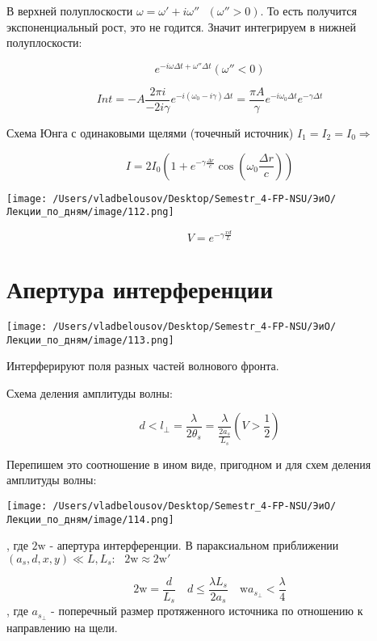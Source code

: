 \documentclass[12pt, a4paper]{report}
\begin{document}
В верхней полуплоскости \( \omega = \omega '+ i \omega '' \text{ }  (\omega '' > 0 ) \). То есть получится экспоненциальный рост, это не годится. Значит интегрируем в нижней полуплоскости: 

\[ e^{- i \omega \Delta t + \omega '' \Delta t } ( \omega'' < 0)  \] 

\[ Int = - A \frac{ 2 \pi i }{- 2 i \gamma } e^{ - i (\omega_0 - i \gamma ) \Delta t } = \frac{\pi A }{\gamma } e^{ - i \omega_0 \Delta t } e^{ - \gamma \Delta t }      \] 

Схема Юнга с одинаковыми щелями  (точечный источник) \( I_1 = I_2 = I_0 \Rightarrow  \) 

\[ I = 2 I_0 \left( 1 + e ^{ - \gamma \frac{\Delta r }{c } } \cos \left( \omega_0 \frac{\Delta r }{c }  \right) \right) \]

\begin{center}
    \texttt{[image: /Users/vladbelousov/Desktop/Semestr\_4-FP-NSU/ЭиО/Лекции\_по\_дням/image/112.png]}
\end{center}

\[ V = e^{ - \gamma \frac{ x d }{L} }  \] 

\section{Апертура интерференции}

\begin{center}
    \texttt{[image: /Users/vladbelousov/Desktop/Semestr\_4-FP-NSU/ЭиО/Лекции\_по\_дням/image/113.png]}
\end{center}
Интерферируют поля разных частей волнового фронта. 


Схема деления амплитуды волны: 

\[ d < l_{ \perp }  = \frac{\lambda}{2 \theta_s } = \frac{\lambda}{\displaystyle \frac{2a_s}{L_s} }  \left( V>\frac{1}{2}  \right) \] 

Перепишем это соотношение в ином виде, пригодном и для схем деления амплитуды волны: 

\begin{center}
    \texttt{[image: /Users/vladbelousov/Desktop/Semestr\_4-FP-NSU/ЭиО/Лекции\_по\_дням/image/114.png]}
\end{center}
, где \( 2 \text{w} \) - апертура интерференции. В параксиальном приближении \( (a_s , d ,x ,y ) \ll L, L_s : \text{ }  2 \text{w}\approx 2 \text{w} ' \) 

\[ 2 \text{w} = \frac{d}{L_s } \quad  d \le \frac{\lambda L_s}{2 a_{s} } \quad  \text{w} a_{s_{\perp } }  <    \frac{\lambda}{4} \] 
, где \( a_{s_{ \perp } }  \) - поперечный размер протяженного источника по отношению к направлению на щели. 
\end{document}
